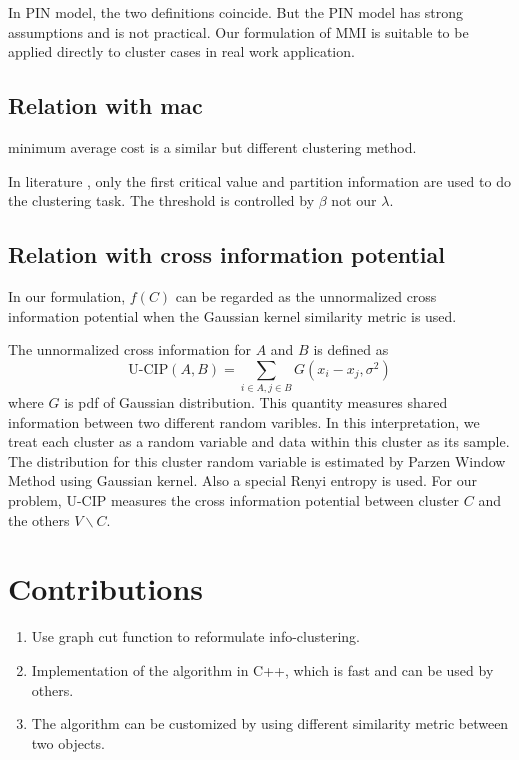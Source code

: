 \documentclass{article}
\begin{document}
In PIN model, the two definitions coincide. But the PIN model has strong assumptions and is not practical. Our formulation of MMI is suitable to be applied directly to cluster cases in real work application.
\subsection{Relation with mac}
minimum average cost is a similar but different clustering method.

In literature \cite{mac}, only the first critical value and partition information are used to do the clustering task. The threshold is controlled by $\beta$ not our $\lambda$.

\subsection{Relation with cross information potential}
In our formulation, $f(C)$ can be regarded as the unnormalized cross information potential \cite{gokcay2002information} when the Gaussian kernel similarity metric is used.

The unnormalized cross information for $A$ and $B$ is defined as 
\begin{equation}
\textrm{U-CIP}(A, B) = \sum_{i \in A, j \in B} G(x_i - x_j, \sigma^2)
\end{equation}
where $G$ is pdf of Gaussian distribution. This quantity measures shared information between two different random varibles. In this interpretation, we treat each cluster as a random variable and data within this cluster as its sample. The distribution for this cluster random variable is estimated by Parzen Window Method using Gaussian kernel. Also a special Renyi entropy is used. For our problem, U-CIP measures the cross information potential between cluster $C$ and the others $V\backslash C$.
\section{Contributions}
\begin{enumerate}
\item Use graph cut function to reformulate info-clustering.
\item Implementation of the algorithm in C++, which is fast and can be used by others.
\item The algorithm can be customized by using different similarity metric between two objects.
\end{enumerate}
\appendix
\end{document}
